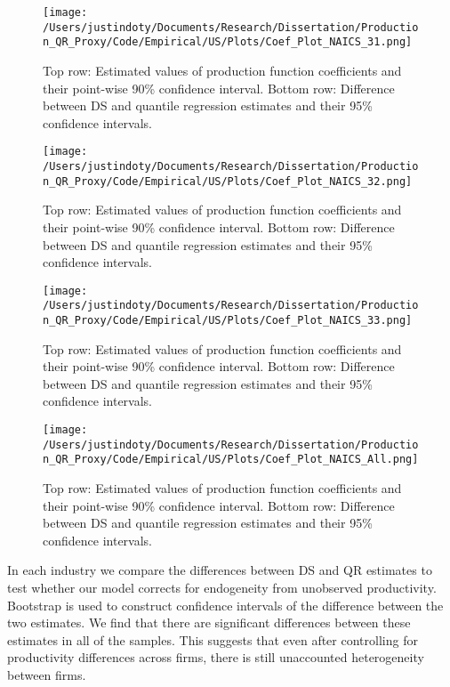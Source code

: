 \documentclass[11pt]{article}
\begin{document}
\begin{figure}[H]
\centering
\texttt{[image: /Users/justindoty/Documents/Research/Dissertation/Production\_QR\_Proxy/Code/Empirical/US/Plots/Coef\_Plot\_NAICS\_31.png]}
\caption{Top row: Estimated values of production function coefficients and their point-wise 90\% confidence interval. Bottom row: Difference between DS and quantile regression estimates and their 95\% confidence intervals.}
\label{fig:31coef}
\end{figure}

\begin{figure}[H]
\centering
\texttt{[image: /Users/justindoty/Documents/Research/Dissertation/Production\_QR\_Proxy/Code/Empirical/US/Plots/Coef\_Plot\_NAICS\_32.png]}
\caption{Top row: Estimated values of production function coefficients and their point-wise 90\% confidence interval. Bottom row: Difference between DS and quantile regression estimates and their 95\% confidence intervals.}
\label{fig:32coef}
\end{figure}

\begin{figure}[H]
\centering
\texttt{[image: /Users/justindoty/Documents/Research/Dissertation/Production\_QR\_Proxy/Code/Empirical/US/Plots/Coef\_Plot\_NAICS\_33.png]}
\caption{Top row: Estimated values of production function coefficients and their point-wise 90\% confidence interval. Bottom row: Difference between DS and quantile regression estimates and their 95\% confidence intervals.}
\label{fig:33coef}
\end{figure}

\begin{figure}[H]
\centering
\texttt{[image: /Users/justindoty/Documents/Research/Dissertation/Production\_QR\_Proxy/Code/Empirical/US/Plots/Coef\_Plot\_NAICS\_All.png]}
\caption{Top row: Estimated values of production function coefficients and their point-wise 90\% confidence interval. Bottom row: Difference between DS and quantile regression estimates and their 95\% confidence intervals.}
\label{fig:USallcoef}
\end{figure}

In each industry we compare the differences between DS and QR estimates to test whether our model corrects for endogeneity from unobserved productivity. Bootstrap is used to construct confidence intervals of the difference between the two estimates. We find that there are significant differences between these estimates in all of the samples. This suggests that even after controlling for productivity differences across firms, there is still unaccounted heterogeneity between firms.
\end{document}
